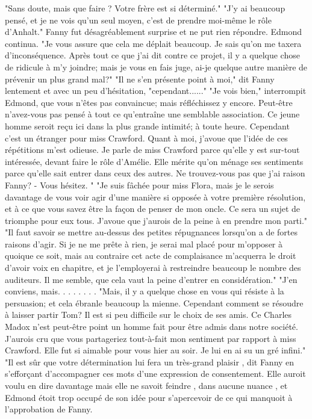 "Sans doute, mais que faire ? Votre frère est si déterminé."
"J'y ai beaucoup pensé, et je ne vois qu'un seul moyen, c'est de prendre moi-même le rôle d'Anhalt."
Fanny fut désagréablement surprise et\setcounter{page}{121} ne put rien répondre. Edmond continua. "Je vous assure que cela me déplait beaucoup. Je sais qu'on me taxera d'inconséquence. Après tout ce que j'ai dit contre ce projet, il y a quelque chose de ridicule à m'y joindre; mais je vous en fais juge, ai-je quelque autre manière de prévenir un plus grand mal?"
"Il ne s'en présente point à moi," dit Fanny lentement et avec un peu d'hésitation, "cependant......"
"Je vois bien," interrompit Edmond, que vous n'êtes pas convaincue; mais réfléchissez y encore. Peut-être n'avez-vous pas pensé à tout ce qu'entraîne une semblable association. Ce jeune homme seroit reçu ici dans la plus grande intimité; à toute heure. Cependant c'est un étranger pour miss Crawford. Quant à moi, j'avoue que l'idée de ces répétitions m'est odieuse. Je parle de miss Crawford parce qu'elle y est sur-tout intéressée, devant faire le rôle d'Amélie. Elle mérite qu'on ménage ses sentiments parce qu'elle sait entrer dans ceux des autres. Ne trouvez-vous pas que j'ai raison Fanny? - Vous hésitez. "
"Je suis fâchée pour miss Flora, mais je le serois davantage de vous voir agir d'une\setcounter{page}{122} manière si opposée à votre première résolution, et à ce que vous savez être la façon de penser de mon oncle. Ce sera un sujet de triomphe pour eux tous. J'avoue que j'aurois de la peine à en prendre mon parti."
"Il faut savoir se mettre au-dessus des petites répugnances lorsqu'on a de fortes raisons d'agir. Si je ne me prête à rien, je serai mal placé pour m'opposer à quoique ce soit, mais au contraire cet acte de complaisance m'acquerra le droit d'avoir voix en chapitre, et je l'employerai à restreindre beaucoup le nombre des auditeurs. Il me semble, que cela vaut la peine d'entrer en considération."
"J'en conviens, mais. . . . . . . .
"Mais, il y a quelque chose en vous qui résiste à la persuasion; et cela ébranle beaucoup la mienne. Cependant comment se résoudre à laisser partir Tom? Il est si peu difficile sur le choix de ses amis. Ce Charles Madox n'est peut-être point un homme fait pour être admis dans notre société. J'aurois cru que vous partageriez tout-à-fait mon sentiment par rapport à miss Crawford. Elle fut si aimable pour vous hier au soir. Je lui en ai su un gré infini."
"Il est sûr que votre détermination lui fera\setcounter{page}{123} un très-grand plaisir , dit Fanny en s'efforçant d'accompagner ces mots d'une expression de consentement. Elle auroit voulu en dire davantage mais elle ne savoit feindre , dans aucune nuance , et Edmond étoit trop occupé de son idée pour s'apercevoir de ce qui manquoit à l'approbation de Fanny.
